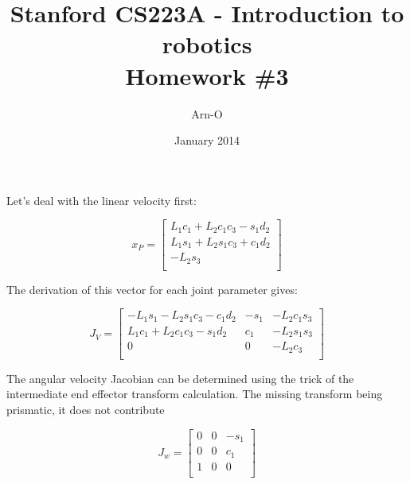 \documentclass{exam}
\begin{document}
\title{Stanford CS223A - Introduction to robotics \\
  Homework \#3}
\author{Arn-O}
\date{January 2014}
\maketitle

\begin{questions}

\question

Let's deal with the linear velocity first:

\begin{equation}
  x_{P} = \begin{bmatrix}
            L_{1}c_{1} + L_{2}c_{1}c_{3} - s_{1}d_{2} \\
            L_{1}s_{1} + L_{2}s_{1}c_{3} + c_{1}d_{2} \\
            -L_{2}s_{3}                               \\
           \end{bmatrix}
\end{equation}

The derivation of this vector for each joint parameter gives:

\begin{equation}
  J_{V} = \begin{bmatrix}
    -L_{1}s_{1} - L_{2}s_{1}c_{3} - c_{1}d_{2} & -s_{1} & -L_{2}c_{1}s_{3} \\
    L_{1}c_{1} + L_{2}c_{1}c_{3} - s_{1}d_{2}  & c_{1}  & -L_{2}s_{1}s_{3} \\
    0                                          & 0      & -L_{2}c_{3}      \\
          \end{bmatrix}
\end{equation}

The angular velocity Jacobian can be determined using the trick of the intermediate end effector transform calculation. The missing transform being prismatic, it does not contribute 

\begin{equation}
  J_{w} = \begin{bmatrix}
    0 & 0 & -s_{1} \\
    0 & 0 & c_{1}  \\
    1 & 0 & 0      \\
          \end{bmatrix}
\end{equation}

\question
\begin{parts}


\end{parts}
\end{questions}
\end{document}
